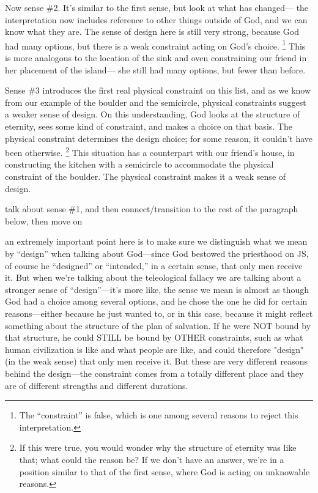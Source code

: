 		Now sense \#2.
		It's similar to the first sense,
			but look at what has changed---%
				the interpretation now includes reference to other things outside of God,
					and we can know what they are.
		The sense of design here is still very strong,
			because God had many options,
				but there is a weak constraint acting on God's choice.%
					\footnote{The ``constraint'' is false, which is one among several reasons to reject this interpretation.}
		This is more analogous to the location of the sink and oven constraining our friend in her placement of the island---%
			she still had many options,
				but fewer than before.
				
		Sense \#3 introduces the first real physical constraint on this list,
			and as we know from our example of the boulder and the semicircle,
				physical constraints suggest a weaker sense of design.
		On this understanding,
			God looks at the structure of eternity,
				sees some kind of constraint,
					and makes a choice on that basis.
		The physical constraint determines the design choice;
			for some reason,
				it couldn't have been otherwise.%
					\footnote{If this were true, you would wonder why the structure of eternity was like that; what could the reason be? If we don't have an answer, we're in a position similar to that of the first sense, where God is acting on unknowable reasons.}
		This situation has a counterpart with our friend's house,
			in constructing the kitchen with a semicircle to accommodate the physical constraint of the boulder.
		The physical constraint makes it a weak sense of design.
			
		talk about sense \#1, and then connect/transition to the rest of the paragraph below, then move on
	
		an extremely important point here is to make sure we distinguish what we mean by ``design'' when talking about God---since God bestowed the priesthood on JS, of course he ``designed'' or ``intended,'' in a certain sense, that only men receive it. But when we're talking about the teleological fallacy we are talking about a stronger sense of ``design''---it's more like, the sense we mean is almost as though God had a choice among several options, and he chose the one he did for certain reasons---either because he just wanted to, or in this case, because it might reflect something about the structure of the plan of salvation. If he were NOT bound by that structure, he could STILL be bound by OTHER constraints, such as what human civilization is like and what people are like, and could therefore "design" (in the weak sense) that only men receive it. But these are very different reasons behind the design---the constraint comes from a totally different place and they are of different strengths and different durations.
		
